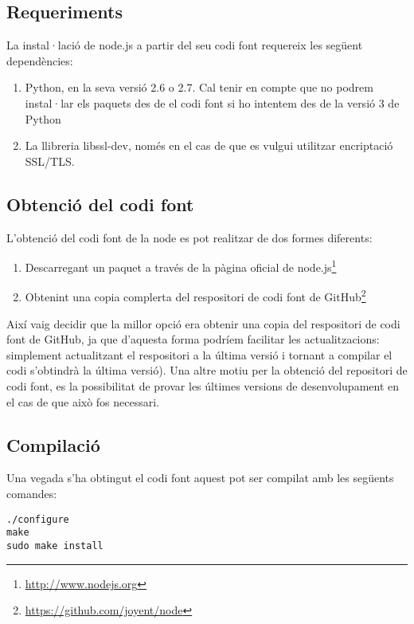 \subsection{Requeriments}

La instal·lació de node.js a partir del seu codi font requereix les següent dependències:

\begin{enumerate}
    \item{Python, en la seva versió 2.6 o 2.7. Cal tenir en compte que no podrem instal·lar els paquets des de el codi font si ho intentem des de la versió 3 de Python}
    \item{La llibreria libssl-dev, només en el cas de que es vulgui utilitzar encriptació SSL/TLS. }
\end{enumerate}

\subsection{Obtenció del codi font}

L'obtenció del codi font de la node es pot realitzar de dos formes diferents: 

\begin{enumerate}
    \item{Descarregant un paquet a través de la pàgina oficial de node.js\footnote{\url{http://www.nodejs.org}}}
    \item{Obtenint una copia complerta del respositori de codi font de GitHub\footnote{\url{https://github.com/joyent/node}}}
\end{enumerate}

Així vaig decidir que la millor opció era obtenir una copia del respositori de codi font de GitHub, ja que d'aquesta forma podríem facilitar les actualitzacions: simplement actualitzant el respositori a la última versió i tornant a compilar el codi s'obtindrà la última versió). Una altre motiu per la obtenció del repositori de codi font, es la possibilitat de provar les últimes versions de desenvolupament en el cas de que això fos necessari.  

\subsection{Compilació}

Una vegada s'ha obtingut el codi font aquest pot ser compilat amb les següents comandes:  
\begin{verbatim}
./configure
make
sudo make install
\end{verbatim}

